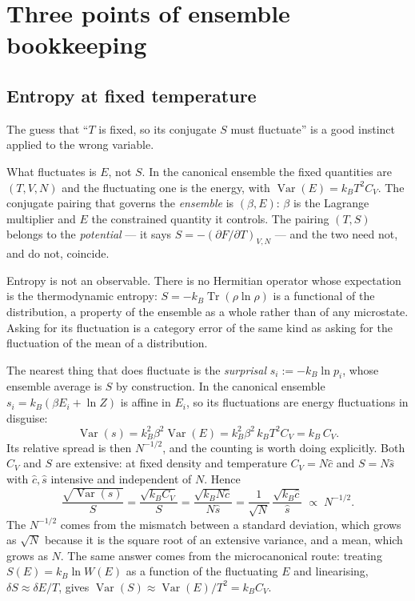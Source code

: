 \documentclass[10pt,a4paper]{article}
\theoremstyle{remark}
\newcommand{\Var}{\operatorname{Var}}
\newcommand{\Tr}{\operatorname{Tr}}
\begin{document}
\section{Three points of ensemble bookkeeping}
\label{app:bookkeeping}

\subsection*{Entropy at fixed temperature}
The guess that ``$T$ is fixed, so its conjugate $S$ must fluctuate'' is a good
instinct applied to the wrong variable.

What fluctuates is $E$, not $S$. In the canonical ensemble the fixed quantities
are $(T,V,N)$ and the fluctuating one is the energy, with $\Var(E)=k_BT^{2}C_V$.
The conjugate pairing that governs the \emph{ensemble} is $(\beta,E)$: $\beta$ is
the Lagrange multiplier and $E$ the constrained quantity it controls. The pairing
$(T,S)$ belongs to the \emph{potential} --- it says $S=-(\partial F/\partial
T)_{V,N}$ --- and the two need not, and do not, coincide.

Entropy is not an observable. There is no Hermitian operator whose expectation is
the thermodynamic entropy: $S=-k_B\Tr(\rho\ln\rho)$ is a functional of the
distribution, a property of the ensemble as a whole rather than of any
microstate. Asking for its fluctuation is a category error of the same kind as
asking for the fluctuation of the mean of a distribution.

The nearest thing that does fluctuate is the \emph{surprisal}
$s_i:=-k_B\ln p_i$, whose ensemble average is $S$ by construction. In the
canonical ensemble $s_i=k_B(\beta E_i+\ln Z)$ is affine in $E_i$, so its
fluctuations are energy fluctuations in disguise:
\[
\Var(s)=k_B^{2}\beta^{2}\Var(E)=k_B^{2}\beta^{2}\,k_BT^{2}C_V=k_B\,C_V .
\]
Its relative spread is then $N^{-1/2}$, and the counting is worth doing
explicitly. Both $C_V$ and $S$ are extensive: at fixed density and temperature
$C_V=N\hat c$ and $S=N\hat s$ with $\hat c,\hat s$ intensive and independent of
$N$. Hence
\[
\frac{\sqrt{\Var(s)}}{S}=\frac{\sqrt{k_BC_V}}{S}
=\frac{\sqrt{k_B N\hat c}}{N\hat s}
=\frac{1}{\sqrt{N}}\,\frac{\sqrt{k_B\hat c}}{\hat s}\;\propto\;N^{-1/2} .
\]
The $N^{-1/2}$ comes from the mismatch between a standard deviation, which grows
as $\sqrt{N}$ because it is the square root of an extensive variance, and a mean,
which grows as $N$. The same answer comes from the microcanonical route:
treating $S(E)=k_B\ln W(E)$ as a function of the fluctuating $E$ and linearising,
$\delta S\approx\delta E/T$, gives $\Var(S)\approx\Var(E)/T^{2}=k_BC_V$.
\end{document}
